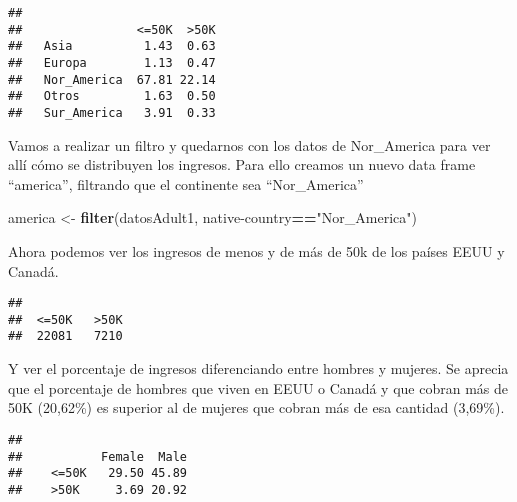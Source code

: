 \documentclass[]{article}
\newenvironment{Shaded}{\begin{snugshade}}{\end{snugshade}}
\newcommand{\DataTypeTok}[1]{\textcolor[rgb]{0.13,0.29,0.53}{#1}}
\newcommand{\DecValTok}[1]{\textcolor[rgb]{0.00,0.00,0.81}{#1}}
\newcommand{\KeywordTok}[1]{\textcolor[rgb]{0.13,0.29,0.53}{\textbf{#1}}}
\newcommand{\NormalTok}[1]{#1}
\newcommand{\OperatorTok}[1]{\textcolor[rgb]{0.81,0.36,0.00}{\textbf{#1}}}
\newcommand{\StringTok}[1]{\textcolor[rgb]{0.31,0.60,0.02}{#1}}
\begin{document}
\begin{verbatim}
##              
##                <=50K  >50K
##   Asia          1.43  0.63
##   Europa        1.13  0.47
##   Nor_America  67.81 22.14
##   Otros         1.63  0.50
##   Sur_America   3.91  0.33
\end{verbatim}

Vamos a realizar un filtro y quedarnos con los datos de Nor\_America
para ver allí cómo se distribuyen los ingresos. Para ello creamos un
nuevo data frame ``america'', filtrando que el continente sea
``Nor\_America''

\begin{Shaded}
\begin{Highlighting}[]
\NormalTok{america \textless{}{-}}\StringTok{ }\KeywordTok{filter}\NormalTok{(datosAdult1, }\StringTok{\textasciigrave{}}\DataTypeTok{native{-}country}\StringTok{\textasciigrave{}}\OperatorTok{==}\StringTok{"Nor\_America"}\NormalTok{)}
\end{Highlighting}
\end{Shaded}

Ahora podemos ver los ingresos de menos y de más de 50k de los países
EEUU y Canadá.

\begin{Shaded}
\end{Shaded}

\begin{verbatim}
## 
##  <=50K   >50K 
##  22081   7210
\end{verbatim}

Y ver el porcentaje de ingresos diferenciando entre hombres y mujeres.
Se aprecia que el porcentaje de hombres que viven en EEUU o Canadá y que
cobran más de 50K (20,62\%) es superior al de mujeres que cobran más de
esa cantidad (3,69\%).

\begin{Shaded}
\end{Shaded}

\begin{verbatim}
##         
##           Female  Male
##    <=50K   29.50 45.89
##    >50K     3.69 20.92
\end{verbatim}
\end{document}
